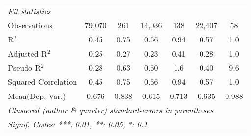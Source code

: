 \begin{tabular}{lcccccc}
   \midrule
   \emph{Fit statistics}\\
   Observations                                               & 79,070      & 261           & 14,036  & 138           & 22,407        & 58\\  
   R$^2$                                                      & 0.45        & 0.75          & 0.66    & 0.94          & 0.57          & 1.0\\  
   Adjusted R$^2$                                             & 0.25        & 0.27          & 0.23    & 0.41          & 0.28          & 1.0\\  
   Pseudo R$^2$                                               & 0.28        & 0.63          & 0.60    & 1.6           & 0.40          & 9.6\\  
   Squared Correlation                                        & 0.45        & 0.75          & 0.66    & 0.94          & 0.57          & 1.0\\  
Mean(Dep. Var.) & 0.676 & 0.838 & 0.615 & 0.713 & 0.635 & 0.988 \\
   \midrule \midrule
   \multicolumn{7}{l}{\emph{Clustered (author \& quarter) standard-errors in parentheses}}\\
   \multicolumn{7}{l}{\emph{Signif. Codes: ***: 0.01, **: 0.05, *: 0.1}}\\
\end{tabular}
\par\endgroup
